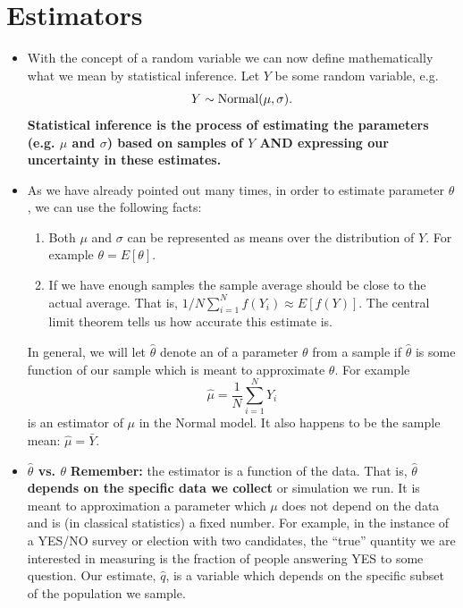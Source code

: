 \section{Estimators}
\begin{itemize}
\item With the concept of a random variable we can now define mathematically what we mean by statistical inference. Let $Y$ be some random variable, e.g. 
\begin{equation*}
Y \sim {\rm Normal}(\mu,\sigma). 
\end{equation*}
{\bf Statistical inference is the process of estimating the parameters (e.g. $\mu$ and $\sigma$) based on samples of $Y$ AND expressing our uncertainty in these estimates.}
\item As we have already pointed out many times, in order to estimate parameter $\theta$, we can use the following facts: 
\begin{enumerate}
\item Both $\mu$ and $\sigma$ can be represented as means over the distribution of $Y$. For example $\theta = E[\theta]$. 
\item If we have enough samples the sample average should be close to the actual average.  That is, $1/N\sum_{i=1}^Nf(Y_i) \approx E[f(Y)]$. The central limit theorem tells us how accurate this estimate is. 
\end{enumerate}
In general, we will let $\hat{\theta}$ denote an  of a parameter $\theta$ from a sample if $\hat{\theta}$ is some function of our sample which is meant to approximate $\theta$.  For example 
\begin{equation*}\label{eq:muhat}
\hat{\mu} = \frac{1}{N}\sum_{i=1}^N Y_i
\end{equation*}
is an estimator of $\mu$ in the Normal model. It also happens to be the sample mean: $\hat{\mu} = \bar{Y}$. 

\item {\bf $\hat{\theta}$ vs. $\theta$}
{\bf Remember:} the estimator is a function of the data. That is, {\bf $\hat{\theta}$ depends on the specific data we collect} or simulation we run. It is meant to approximation a parameter which $\mu$ does not depend on the data and is (in classical statistics) a fixed number. For example,  in the instance of a YES/NO survey or election with two candidates, the ``true'' quantity we are interested in measuring is the fraction of people answering YES to some question. Our estimate, $\hat{q}$, is a variable which depends on the specific subset of the population we sample. 
\end{itemize}


